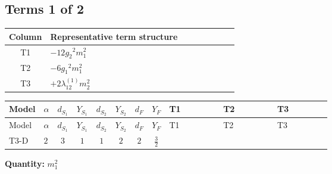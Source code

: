 \documentclass[8pt]{article}
\begin{document}
\begin{landscape}
\subsection*{Terms 1 of 2}
\begin{center}
\begin{tabular}{@{}c >{\raggedright\arraybackslash}p{0.82\linewidth}@{}}
\toprule
Column & Representative term structure \\
\midrule
T1 & \(\displaystyle -12 {g_2}^2 {m_1^2}\) \\
\midrule
T2 & \(\displaystyle -6 {g_1}^2 {m_1^2}\) \\
\midrule
T3 & \(\displaystyle +2 {\lambda_{12}^{(1)}} {m_2^2}\) \\
\midrule
\bottomrule
\end{tabular}
\end{center}
\smallskip
\tiny
\begin{longtable}{@{}llcccccc >{\raggedright\arraybackslash}p{0.21\linewidth} >{\raggedright\arraybackslash}p{0.21\linewidth} >{\raggedright\arraybackslash}p{0.21\linewidth}@{}}
\toprule
Model & $\alpha$ & $d_{S_1}$ & $Y_{S_1}$ & $d_{S_2}$ & $Y_{S_2}$ & $d_F$ & $Y_F$ & T1 & T2 & T3 \\
\midrule
\endfirsthead
\toprule
Model & $\alpha$ & $d_{S_1}$ & $Y_{S_1}$ & $d_{S_2}$ & $Y_{S_2}$ & $d_F$ & $Y_F$ & T1 & T2 & T3 \\
\midrule
\endhead
T3-D & $2$ & $3$ & $1$ & $1$ & $2$ & $2$ & $\frac{3}{2}$ & \scriptsize\adjustbox{max width=\linewidth}{$\begin{gathered} -12 {g_2}^2 {m_1^2}\end{gathered}$} & \scriptsize\adjustbox{max width=\linewidth}{$\begin{gathered} -6 {g_1}^2 {m_1^2}\end{gathered}$} & \scriptsize\adjustbox{max width=\linewidth}{$\begin{gathered} +2 {\lambda_{12}^{(1)}} {m_2^2}\end{gathered}$} \\
\midrule
\bottomrule
\end{longtable}
\clearpage
\noindent\textbf{Quantity: }$m_1^2$\par\smallskip

\end{landscape}
\end{document}
